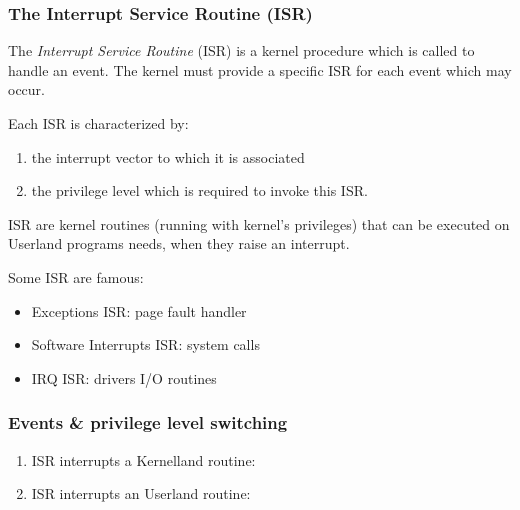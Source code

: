 \begin{frame}
  \frametitle{The Interrupt Service Routine (ISR)}

  The {\em Interrupt Service Routine} (ISR) is a kernel procedure which is
  called to handle an event. The kernel must provide a specific ISR for each
  event which may occur.

   \-

   Each ISR is characterized by:

  \begin{enumerate}
    \item the interrupt vector to which it is associated
    \item the privilege level which is required to invoke this ISR.
  \end{enumerate}

  \-


  ISR are kernel routines (running with kernel's privileges) that can be
  executed on Userland programs needs, when they raise an interrupt.

  \-

  Some ISR are famous:

  \begin{itemize}
    \item Exceptions ISR: page fault handler
    \item Software Interrupts ISR: system calls
    \item IRQ ISR: drivers I/O routines
  \end{itemize}

\end{frame}

%
%
%

\begin{frame}
  \frametitle{Events \& privilege level switching}

  \begin{enumerate}
    \item ISR interrupts a Kernelland routine:
      \begin{center}
      \end{center}

    \item ISR interrupts an Userland routine:
      \begin{center}
      \end{center}
  \end{enumerate}

\end{frame}

